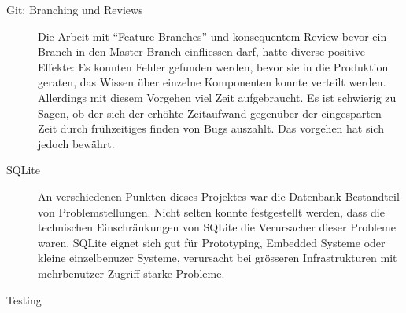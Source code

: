 \begin{description}
	\item[Git: Branching und Reviews] Die Arbeit mit \enquote{Feature Branches} und
	konsequentem Review bevor ein Branch in den Master-Branch einfliessen darf,
	hatte diverse positive Effekte: Es konnten Fehler gefunden werden, bevor sie in
	die Produktion geraten, das Wissen über einzelne Komponenten konnte verteilt
	werden. Allerdings mit diesem Vorgehen viel Zeit aufgebraucht. Es ist schwierig
	zu Sagen, ob der sich der erhöhte Zeitaufwand gegenüber der eingesparten Zeit
	durch frühzeitiges finden von Bugs auszahlt. Das vorgehen hat sich jedoch
	bewährt.
	
	\item[SQLite] An verschiedenen Punkten dieses Projektes war die Datenbank
	Bestandteil von Problemstellungen. Nicht selten konnte festgestellt werden,
	dass die technischen Einschränkungen von SQLite die Verursacher dieser Probleme
	waren. SQLite eignet sich gut für Prototyping, Embedded Systeme oder kleine
	einzelbenuzer Systeme, verursacht bei grösseren Infrastrukturen mit
	mehrbenutzer Zugriff starke Probleme.
	
	\item[Testing] 
	
\end{description}

